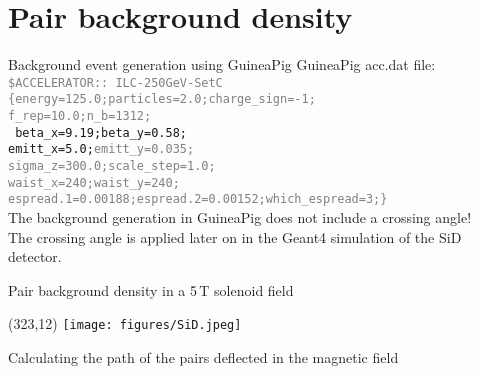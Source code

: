 \documentclass[xcolor={dvipsnames}]{beamer}
\newcommand{\sidlogo}{
  \setlength{\TPHorizModule}{1pt}
  \setlength{\TPVertModule}{1pt}
  \begin{textblock}{1}(323,12)
   \texttt{[image: figures/SiD.jpeg]}
  \end{textblock}
  }
\begin{document}
\section{Pair background density}
\begin{frame}{Background event generation using GuineaPig}
GuineaPig acc.dat file:\\
{\small\texttt{\textcolor{Gray}{\$ACCELERATOR:: ILC-250GeV-SetC \\                                                                            
\{energy=125.0;particles=2.0;charge\_sign=-1;\\
f\_rep=10.0;n\_b=1312;\\}
beta\_x=9.19;beta\_y=0.58;\\
emitt\_x=5.0;\textcolor{Gray}{emitt\_y=0.035;\\
sigma\_z=300.0;scale\_step=1.0;\\
waist\_x=240;waist\_y=240;\\
espread.1=0.00188;espread.2=0.00152;which\_espread=3;\}}
}}\\
\vspace*{0.3cm}
 The background generation in GuineaPig \alert{does not include a crossing angle}!\\
 The crossing angle is applied later on in the Geant4 simulation of the SiD detector.
\end{frame}

\begin{frame}{Pair background density in a 5\,T solenoid field}
\sidlogo
Calculating the path of the pairs deflected in the magnetic field
%
\end{frame}
\end{document}
